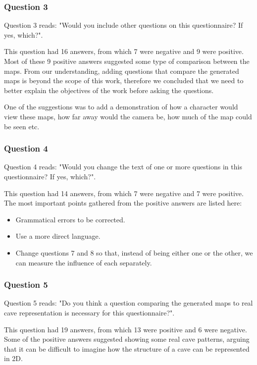 \subsubsection{Question 3}

Question 3 reads: "Would you include other questions on this questionnaire? If yes, which?".

This question had 16 answers, from which 7 were negative and 9 were positive. Most of these 9 positive answers suggested some type of comparison between the maps. From our understanding, adding questions that compare the generated maps is beyond the scope of this work, therefore we concluded that we need to better explain the objectives of the work before asking the questions.

One of the suggestions was to add a demonstration of how a character would view these maps, how far away would the camera be, how much of the map could be seen etc. 

\subsubsection{Question 4}

Question 4 reads: "Would you change the text of one or more questions in this questionnaire? If yes, which?".

This question had 14 answers, from which 7 were negative and 7 were positive. The most important points gathered from the positive answers are listed here:
\begin{itemize}
    \item Grammatical errors to be corrected.
    \item Use a more direct language.
    \item Change questions 7 and 8 so that, instead of being either one or the other, we can measure the influence of each separately.
\end{itemize}

\subsubsection{Question 5}

Question 5 reads: "Do you think a question comparing the generated maps to real cave representation is necessary for this questionnaire?".

This question had 19 answers, from which 13 were positive and 6 were negative. Some of the positive answers suggested showing some real cave patterns, arguing that it can be difficult to imagine how the structure of a cave can be represented in 2D.

